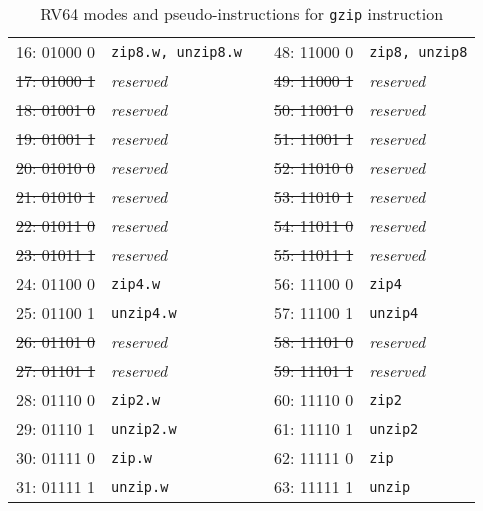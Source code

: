 \begin{table}[h]
\begin{small}
\begin{center}
\begin{tabular}{c l p{1in} c l}
\cline{1-2}
\cline{4-5}

      16: 01000 0  & {\tt zip8.w, unzip8.w}   &   &         48: 11000 0  & {\tt zip8, unzip8}      \\
\sout{17: 01000 1} & {\it reserved}           &   &   \sout{49: 11000 1} & {\it reserved}          \\
\sout{18: 01001 0} & {\it reserved}           &   &   \sout{50: 11001 0} & {\it reserved}          \\
\sout{19: 01001 1} & {\it reserved}           &   &   \sout{51: 11001 1} & {\it reserved}          \\
\sout{20: 01010 0} & {\it reserved}           &   &   \sout{52: 11010 0} & {\it reserved}          \\
\sout{21: 01010 1} & {\it reserved}           &   &   \sout{53: 11010 1} & {\it reserved}          \\
\sout{22: 01011 0} & {\it reserved}           &   &   \sout{54: 11011 0} & {\it reserved}          \\
\sout{23: 01011 1} & {\it reserved}           &   &   \sout{55: 11011 1} & {\it reserved}          \\

\cline{1-2}
\cline{4-5}

      24: 01100 0  & {\tt zip4.w}             &   &         56: 11100 0  & {\tt zip4}              \\
      25: 01100 1  & {\tt unzip4.w}           &   &         57: 11100 1  & {\tt unzip4}            \\
\sout{26: 01101 0} & {\it reserved}           &   &   \sout{58: 11101 0} & {\it reserved}          \\
\sout{27: 01101 1} & {\it reserved}           &   &   \sout{59: 11101 1} & {\it reserved}          \\
      28: 01110 0  & {\tt zip2.w}             &   &         60: 11110 0  & {\tt zip2}              \\
      29: 01110 1  & {\tt unzip2.w}           &   &         61: 11110 1  & {\tt unzip2}            \\
      30: 01111 0  & {\tt zip.w}              &   &         62: 11111 0  & {\tt zip}               \\
      31: 01111 1  & {\tt unzip.w}            &   &         63: 11111 1  & {\tt unzip}             \\
\end{tabular}
\end{center}
\end{small}
\caption{RV64 modes and pseudo-instructions for {\tt gzip} instruction}
\label{gzip64-modes}
\end{table}

